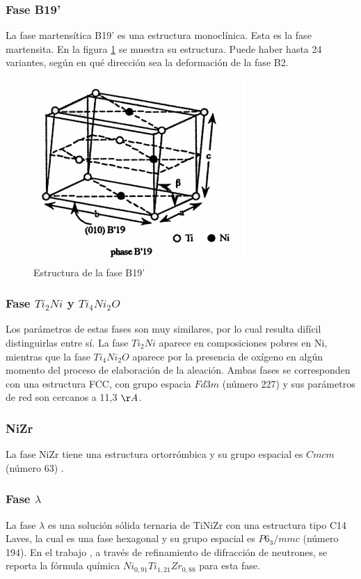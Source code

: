 \documentclass[12pt]{article}
\theoremstyle{definition}
\theoremstyle{remark}
\begin{document}
\subsubsection{Fase B19'}
La fase martensítica B19' es una estructura monoclínica. Esta es la fase martensita. En la figura \ref{B19pPhase} se muestra su estructura. Puede haber hasta 24 variantes, según en qué dirección sea la deformación de la fase B2.
\begin{figure}[H]
	\centering
	\includegraphics[scale=0.5]{img/B19pPhase.png}
	\caption{Estructura de la fase B19'}
	\label{B19pPhase}
\end{figure}

\subsubsection{Fase $Ti_2Ni$ y $Ti_4Ni_2O$}

Los parámetros de estas fases son muy similares, por lo cual resulta difícil distinguirlas entre sí. La fase $Ti_2Ni$ aparece en composiciones pobres en Ni, mientras que la fase $Ti_4Ni_2O$ aparece por la presencia de oxígeno en algún momento del proceso de elaboración de la aleación. Ambas fases se corresponden con una estructura FCC, con grupo espacia $Fd3m$ (número 227) y sus parámetros de red son cercanos a 11,3 $\AA$.

\subsubsection{NiZr}
La fase NiZr tiene una estructura ortorrómbica y su grupo espacial es $Cmcm$ (número 63) \cite{Kirkpatrick1962}.

\subsubsection{Fase $\lambda$}
La fase $\lambda$ es una solución sólida ternaria de TiNiZr con una estructura tipo C14 Laves, la cual es una fase hexagonal y su grupo espacial es $P6_3/mmc$ (número 194). En el trabajo \cite{Bououdina2003}, a través de refinamiento de difracción de neutrones, se reporta la fórmula química $Ni_{0,91}Ti_{1,21}Zr_{0,88}$ para esta fase.
\end{document}
